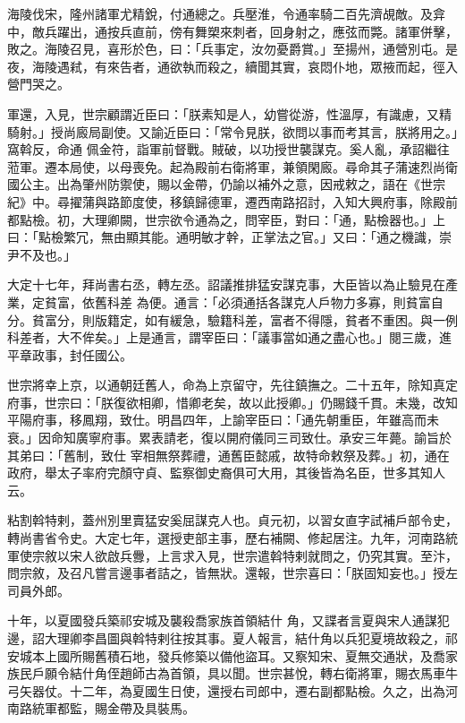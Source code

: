 \begin{pinyinscope}
 海陵伐宋，隆州諸軍尤精銳，付通總之。兵壓淮，令通率騎二百先濟覘敵。及弇中，敵兵躍出，通按兵直前，傍有舞槊來刺者，回身射之，應弦而斃。諸軍併擊，敗之。海陵召見，喜形於色，曰：「兵事定，汝勿憂爵賞。」至揚州，通營別屯。是夜，海陵遇弒，有來告者，通欲執而殺之，續聞其實，哀悶仆地，眾掖而起，徑入營門哭之。



 軍還，入見，世宗顧謂近臣曰：「朕素知是人，幼嘗從游，性溫厚，有識慮，又精騎射。」授尚廄局副使。又諭近臣曰：「常令見朕，欲問以事而考其言，朕將用之。」窩斡反，命通
 佩金符，詣軍前督戰。賊破，以功授世襲謀克。奚人亂，承詔繼往蒞軍。遷本局使，以母喪免。起為殿前右衛將軍，兼領閑廄。尋命其子蒲速烈尚衛國公主。出為肇州防禦使，賜以金帶，仍諭以補外之意，因戒敕之，語在《世宗紀》中。尋擢蒲與路節度使，移鎮歸德軍，遷西南路招討，入知大興府事，除殿前都點檢。初，大理卿闕，世宗欲令通為之，問宰臣，對曰：「通，點檢器也。」上曰：「點檢繁冗，無由顯其能。通明敏才幹，正掌法之官。」又曰：「通之機識，崇尹不及也。」



 大定十七年，拜尚書右丞，轉左丞。詔議推排猛安謀克事，大臣皆以為止驗見在產業，定貧富，依舊科差
 為便。通言：「必須通括各謀克人戶物力多寡，則貧富自分。貧富分，則版籍定，如有緩急，驗籍科差，富者不得隱，貧者不重困。與一例科差者，大不侔矣。」上是通言，謂宰臣曰：「議事當如通之盡心也。」閱三歲，進平章政事，封任國公。



 世宗將幸上京，以通朝廷舊人，命為上京留守，先往鎮撫之。二十五年，除知真定府事，世宗曰：「朕復欲相卿，惜卿老矣，故以此授卿。」仍賜錢千貫。未幾，改知平陽府事，移鳳翔，致仕。明昌四年，上諭宰臣曰：「通先朝重臣，年雖高而未衰。」因命知廣寧府事。累表請老，復以開府儀同三司致仕。承安三年薨。諭旨於其弟曰：「舊制，致仕
 宰相無祭葬禮，通舊臣懿戚，故特命敕祭及葬。」初，通在政府，舉太子率府完顏守貞、監察御史裔俱可大用，其後皆為名臣，世多其知人云。



 粘割斡特剌，蓋州別里賣猛安奚屈謀克人也。貞元初，以習女直字試補戶部令史，轉尚書省令史。大定七年，選授吏部主事，歷右補闕、修起居注。九年，河南路統軍使宗敘以宋人欲啟兵釁，上言求入見，世宗遣斡特剌就問之，仍究其實。至汴，問宗敘，及召凡嘗言邊事者詰之，皆無狀。還報，世宗喜曰：「朕固知妄也。」授左司員外郎。



 十年，以夏國發兵築祁安城及襲殺喬家族首領結什
 角，又諜者言夏與宋人通謀犯邊，詔大理卿李昌圖與斡特剌往按其事。夏人報言，結什角以兵犯夏境故殺之，祁安城本上國所賜舊積石地，發兵修築以備他盜耳。又察知宋、夏無交通狀，及喬家族民戶願令結什角侄趙師古為首領，具以聞。世宗甚悅，轉右衛將軍，賜衣馬車牛弓矢器仗。十二年，為夏國生日使，還授右司郎中，遷右副都點檢。久之，出為河南路統軍都監，賜金帶及具裝馬。




\end{pinyinscope}
